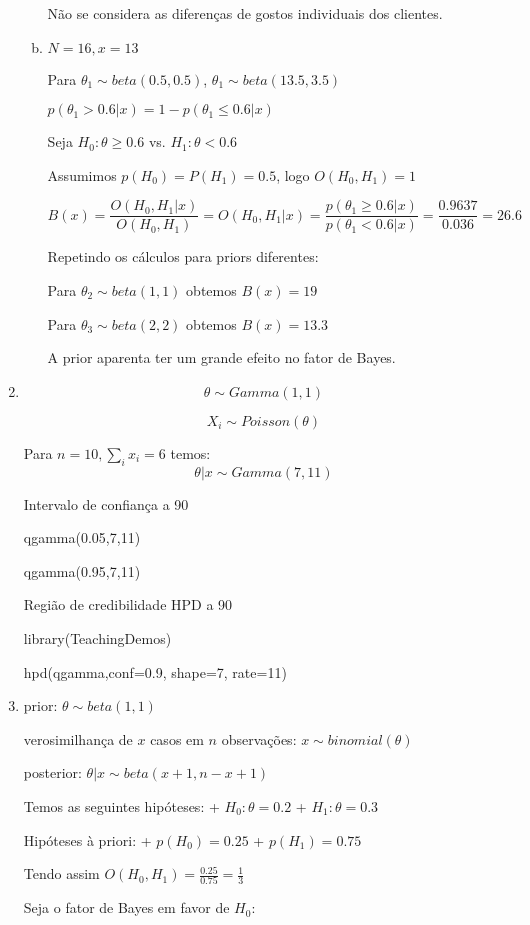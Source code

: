 \documentclass[10pt,brazil,addpoints]{exam}
\begin{document}
\begin{enumerate}[1.]
\begin{enumerate}[a)]
Não se considera as diferenças de gostos individuais dos clientes.

\item $N=16,x=13$

Para $\theta_1 \sim beta(0.5,0.5)$, $\theta_1 \sim beta(13.5,3.5)$


$p(\theta_1 > 0.6 | x) = 1 - p(\theta_1 \leq 0.6 | x)$

Seja $H_0:\theta \geq 0.6$ vs. $H_1:\theta < 0.6$

Assumimos $p(H_0) = P(H_1) = 0.5$, logo $O(H_0,H_1) = 1$

$$B(x) = \frac{O(H_0,H_1|x)}{O(H_0,H_1)} = O(H_0,H_1|x) = \frac{p(\theta_1 \geq 0.6 | x)}{p(\theta_1 < 0.6 | x)} = \frac{0.9637}{0.036} = 26.6$$

Repetindo os cálculos para priors diferentes:

Para $\theta_2 \sim beta(1,1)$ obtemos $B(x) = 19$

Para $\theta_3 \sim beta(2,2)$ obtemos $B(x) = 13.3$

A prior aparenta ter um grande efeito no fator de Bayes.


\end{enumerate} 

\item $$\theta \sim Gamma(1,1)$$

$$X_i \sim Poisson(\theta)$$

Para $n=10, \sum_i x_i = 6$ temos:
$$\theta | x \sim Gamma(7,11)$$

Intervalo de confiança a 90%


qgamma(0.05,7,11)

qgamma(0.95,7,11)


Região de credibilidade HPD a 90%


library(TeachingDemos)

hpd(qgamma,conf=0.9, shape=7, rate=11)


\item prior: $\theta \sim beta(1,1)$

verosimilhança de $x$ casos em $n$ observações: $x \sim binomial(\theta)$

posterior: $\theta | x \sim beta(x+1,n-x+1)$

Temos as seguintes hipóteses:
+ $H_0: \theta = 0.2$
+ $H_1: \theta = 0.3$

Hipóteses à priori:
+ $p(H_0) = 0.25$
+ $p(H_1) = 0.75$

Tendo assim $O(H_0,H_1) = \frac{0.25}{0.75} = \frac{1}{3}$

Seja o fator de Bayes em favor de $H_0$: 


\end{enumerate}
\end{document}
